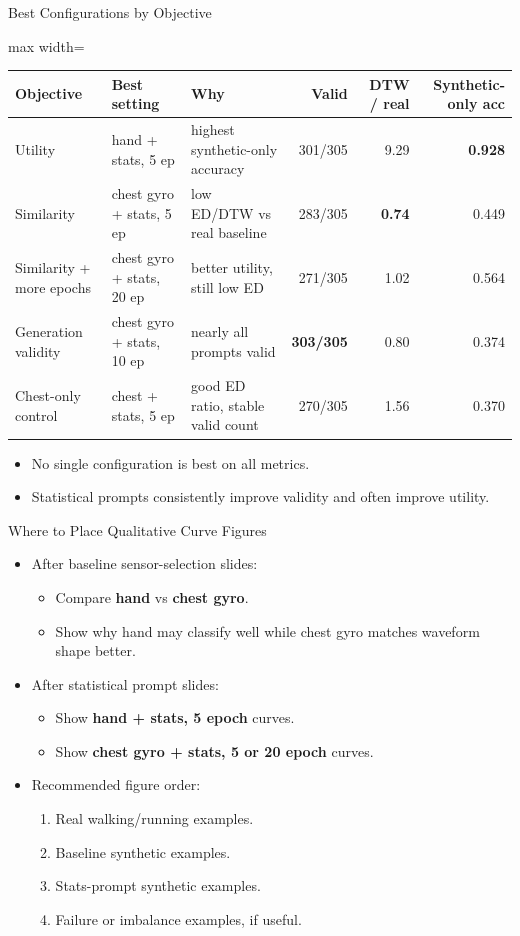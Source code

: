 \documentclass[aspectratio=169,11pt]{ctexbeamer}
\newcommand{\best}[1]{\textcolor{goodgreen}{\textbf{#1}}}
\begin{document}
\begin{frame}{Best Configurations by Objective}
\small
\begin{adjustbox}{max width=\textwidth}
\begin{tabular}{lllrrr}
\toprule
Objective & Best setting & Why & Valid & DTW / real & Synthetic-only acc \\
\midrule
Utility & hand + stats, 5 ep & highest synthetic-only accuracy & 301/305 & 9.29 & \best{0.928} \\
Similarity & chest gyro + stats, 5 ep & low ED/DTW vs real baseline & 283/305 & \best{0.74} & 0.449 \\
Similarity + more epochs & chest gyro + stats, 20 ep & better utility, still low ED & 271/305 & 1.02 & 0.564 \\
Generation validity & chest gyro + stats, 10 ep & nearly all prompts valid & \best{303/305} & 0.80 & 0.374 \\
Chest-only control & chest + stats, 5 ep & good ED ratio, stable valid count & 270/305 & 1.56 & 0.370 \\
\bottomrule
\end{tabular}
\end{adjustbox}
\vspace{0.5em}
\begin{itemize}
  \item No single configuration is best on all metrics.
  \item Statistical prompts consistently improve validity and often improve utility.
\end{itemize}
\end{frame}

\begin{frame}{Where to Place Qualitative Curve Figures}
\begin{itemize}
  \item After baseline sensor-selection slides:
  \begin{itemize}
    \item Compare \textbf{hand} vs \textbf{chest gyro}.
    \item Show why hand may classify well while chest gyro matches waveform shape better.
  \end{itemize}
  \item After statistical prompt slides:
  \begin{itemize}
    \item Show \textbf{hand + stats, 5 epoch} curves.
    \item Show \textbf{chest gyro + stats, 5 or 20 epoch} curves.
  \end{itemize}
  \item Recommended figure order:
  \begin{enumerate}
    \item Real walking/running examples.
    \item Baseline synthetic examples.
    \item Stats-prompt synthetic examples.
    \item Failure or imbalance examples, if useful.
  \end{enumerate}
\end{itemize}
\end{frame}
\end{document}

